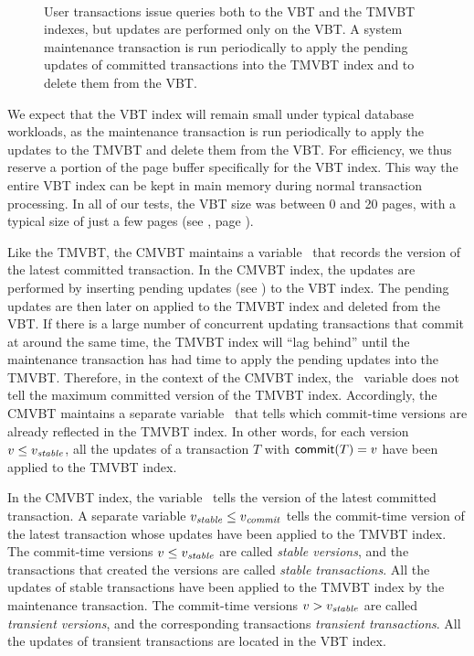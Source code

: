 \begin{figure}[htb]
\begin{center}
  \\
  {User transactions issue queries both to the VBT and the
  TMVBT indexes, but updates are performed only on the VBT\@.
  A system maintenance transaction is run periodically to apply the
  pending updates of committed transactions into the TMVBT index and to
  delete them from the VBT\@.}
  \label{fig:cmvbt-setup}
\end{center}
\end{figure}

We expect that the VBT index will remain small under typical database
workloads, as the maintenance transaction is run periodically to apply
the updates to the TMVBT and delete them from the VBT\@.
For efficiency, we thus reserve a portion of the page buffer specifically for
the VBT index. 
This way the entire VBT index can be kept in main memory during normal
transaction processing.
In all of our tests, the VBT size was between \num{0} and \num{20} pages,
with a typical size of just a few pages (see , 
page \pageref{test:vbt-size}).

Like the TMVBT, the CMVBT maintains a variable \comver\ that records the
version of the latest committed transaction.
In the CMVBT index, the updates are performed by inserting pending updates
(see ) to the VBT index.
The pending updates are then later on applied to the TMVBT index and deleted
from the VBT\@.
If there is a large number of concurrent updating transactions that commit at
around the same time, the TMVBT index will ``lag behind'' until the
maintenance transaction has had time to apply the pending updates into the
TMVBT\@. 
Therefore, in the context of the CMVBT index, the \comver\ variable
does not tell the maximum committed version of the TMVBT index.
Accordingly, the CMVBT maintains a separate variable \stablever\ that tells
which commit-time versions are already reflected in the TMVBT index. 
In other words, for each version $v \leq \smash{v_{\text{\textit{stable}}}}$, all the updates
of a transaction $T$ with $\text{\textsf{commit}}(T) = v$ have been applied to
the TMVBT index.

\thmskip 
\begin{definition}
\label{def:stablever}
In the CMVBT index, the variable \comver\ tells the version of the latest
committed transaction.
A separate variable $\smash{v_{\text{\textit{stable}}}} \leq \smash{v_{\text{\textit{commit}}}}$ tells the
commit-time version of the latest transaction whose updates have been applied
to the TMVBT index.
The commit-time versions $v \leq \smash{v_{\text{\textit{stable}}}}$ are called \emph{stable
versions}, and the transactions that created the versions are called
\emph{stable transactions}.
All the updates of stable transactions have been applied to the TMVBT index
by the maintenance transaction.
The commit-time versions $v > \smash{v_{\text{\textit{stable}}}}$ are called \emph{transient
versions}, and the corresponding transactions \emph{transient transactions}.
All the updates of transient transactions are located in the VBT index.
\end{definition}
\thmskip 

